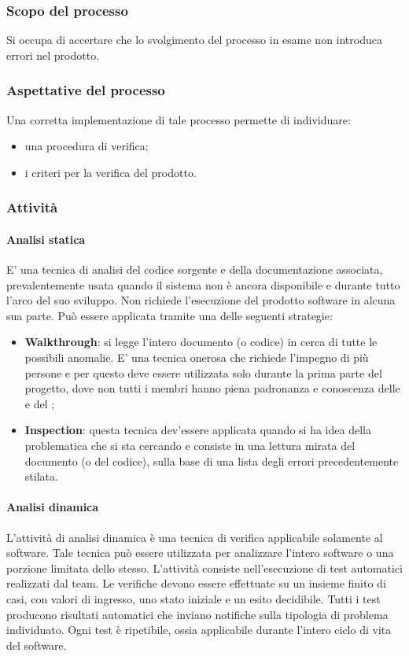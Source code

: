 \subsubsection{Scopo del processo}
Si occupa di accertare che lo svolgimento del processo in esame non introduca errori nel prodotto.
\subsubsection{Aspettative del processo}
Una corretta implementazione di tale processo permette di individuare:
\begin{itemize}
	\item una procedura di verifica;
	\item i criteri per la verifica del prodotto.
\end{itemize}
\subsubsection{Attività}
 \paragraph{Analisi statica}
E' una tecnica di analisi del codice sorgente e della documentazione associata, prevalentemente
usata quando il sistema non è ancora disponibile e durante tutto l'arco del suo sviluppo. Non
richiede l'esecuzione del prodotto software in alcuna sua parte. Può essere applicata tramite una
delle seguenti strategie:
\begin{itemize}
	\item \textbf{Walkthrough}: si legge l'intero documento (o codice) in cerca di tutte le possibili anomalie. E' una tecnica onerosa che richiede l'impegno di più persone e per questo deve essere utilizzata solo durante la prima parte del progetto, dove non tutti i membri hanno piena padronanza e conoscenza delle \NPdoc e del \PQdoc;
	\item \textbf{Inspection}: questa tecnica dev'essere applicata quando si ha idea della
problematica che si sta cercando e consiste in una lettura mirata del
documento (o del codice), sulla base di una lista degli errori precedentemente
stilata.
\end{itemize}
 \paragraph{Analisi dinamica}
L'attività di analisi dinamica è una tecnica di verifica applicabile solamente al software. Tale tecnica può essere utilizzata per analizzare l'intero software o una
porzione limitata dello stesso. L'attività consiste nell'esecuzione di test automatici realizzati
dal team. Le verifiche devono essere effettuate su un insieme finito di casi, con valori di
ingresso, uno stato iniziale e un esito decidibile. Tutti i test producono risultati automatici
che inviano notifiche sulla tipologia di problema individuato. Ogni test è ripetibile, ossia
applicabile durante l'intero ciclo di vita del software.
